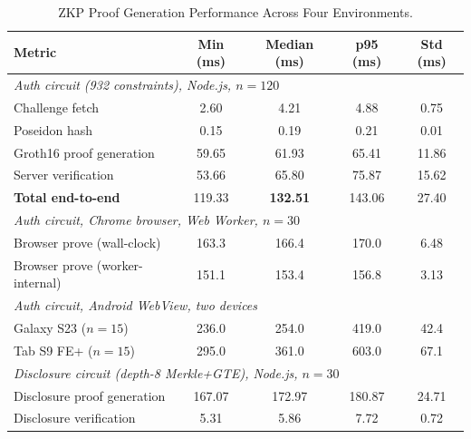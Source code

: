 \documentclass[12pt,a4paper,oneside]{report}
\begin{document}
\begin{table}[htbp]
\renewcommand{\arraystretch}{1.25}
\caption{ZKP Proof Generation Performance Across Four Environments.}
\label{tab:zkp_results}
\centering
\footnotesize
\begin{tabular}{lcccc}
\toprule
\textbf{Metric} & \textbf{Min (ms)} & \textbf{Median (ms)} &
\textbf{p95 (ms)} & \textbf{Std (ms)} \\
\midrule
\multicolumn{5}{l}{\textit{Auth circuit (932 constraints), Node.js, $n{=}120$}} \\
Challenge fetch              & 2.60  & 4.21  & 4.88  & 0.75  \\
Poseidon hash                & 0.15  & 0.19  & 0.21  & 0.01  \\
Groth16 proof generation     & 59.65 & 61.93 & 65.41 & 11.86 \\
Server verification          & 53.66 & 65.80 & 75.87 & 15.62 \\
\textbf{Total end-to-end}    & 119.33 & \textbf{132.51} & 143.06 & 27.40 \\
\midrule
\multicolumn{5}{l}{\textit{Auth circuit, Chrome browser, Web Worker, $n{=}30$}} \\
Browser prove (wall-clock)         & 163.3 & 166.4 & 170.0 & 6.48 \\
Browser prove (worker-internal)    & 151.1 & 153.4 & 156.8 & 3.13 \\
\midrule
\multicolumn{5}{l}{\textit{Auth circuit, Android WebView, two devices}} \\
Galaxy S23 ($n{=}15$)              & 236.0 & 254.0 & 419.0 & 42.4 \\
Tab S9 FE+ ($n{=}15$)               & 295.0 & 361.0 & 603.0 & 67.1 \\
\midrule
\multicolumn{5}{l}{\textit{Disclosure circuit (depth-8 Merkle+GTE), Node.js, $n{=}30$}} \\
Disclosure proof generation  & 167.07 & 172.97 & 180.87 & 24.71 \\
Disclosure verification      & 5.31  & 5.86  & 7.72  & 0.72  \\
\bottomrule
\end{tabular}
\end{table}
\end{document}
